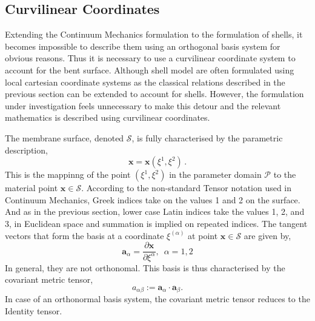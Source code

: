\documentclass[../main.tex]{subfiles}
\begin{document}
\subsection{Curvilinear Coordinates} \label{sec:curvy_coords}
Extending the Continuum Mechanics formulation to the formulation of shells,
 it becomes impossible to describe them using an orthogonal basis system for obvious reasons.
 Thus it is necessary to use a curvilinear coordinate system to account for the bent surface.
 Although shell model are often formulated using local cartesian coordinate systems as the
 classical relations described in the previous section can be extended to account for shells.
 However, the formulation under investigation feels unnecessary to make this detour and the relevant
 mathematics is described using curvilinear coordinates.

The membrane surface, denoted $\mathcal{S}$, is fully characterised by 
 the parametric description,
 \begin{equation} \label{parametric_definition}
    \boldsymbol{x} = \boldsymbol{x}(\xi^{1}, \xi^{2}) \, .
 \end{equation}
This is the mappinng of the point $(\xi^{1}, \xi^{2})$ in the parameter domain $\mathcal{P}$
 to the material point $\boldsymbol{x} \in \mathcal{S}$.
According to the non-standard Tensor notation used in Continuum Mechanics,
 Greek indices take on the values 1 and 2 on the surface. And as in the previous section,
 lower case Latin indices take the values 1, 2, and 3, in Euclidean space and summation is
 implied on repeated indices.
The tangent vectors that form the basis at a coordinate $\xi^(\alpha)$ at point $\boldsymbol{x} \in \mathcal{S}$ are
 given by,
 \begin{equation}\label{tangent_parametric}
    \boldsymbol{a}_{\alpha} = \frac{\partial \boldsymbol{x}}{\partial \xi^{\alpha}}, \,\,\, \alpha = 1, 2
 \end{equation}
In general, they are not orthonomal. This basis is thus characterised by the covariant metric tensor,
\begin{equation}\label{metric_def}
    a_{\alpha \beta} := \boldsymbol{a}_{\alpha} \cdot \boldsymbol{a}_{\beta}.
\end{equation}
In case of an orthonormal basis system, the covariant metric tensor reduces to the Identity tensor.
\end{document}
